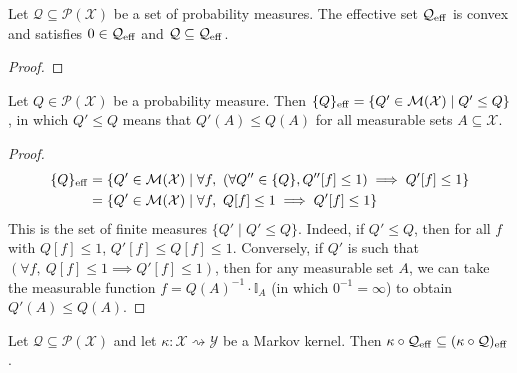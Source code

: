 \begin{lemma}\label{lem:convex_effectiveSet}
  Let $\mathcal{Q} \subseteq \mathcal{P}(\mathcal{X})$ be a set of probability measures.
The effective set $\mathcal{Q}_{\operatorname{eff}}$ is convex and satisfies $0 \in \mathcal{Q}_{\operatorname{eff}}$ and $\mathcal{Q} \subseteq \mathcal{Q}_{\operatorname{eff}}$.
\end{lemma}

\begin{proof}

\end{proof}


\begin{lemma}\label{lem:effectiveSet_singleton}
Let $Q \in \mathcal{P}(\mathcal{X})$ be a probability measure. Then $\{Q\}_{\operatorname{eff}} = \{Q' \in \mathcal{M}(\mathcal{X}) \mid Q' \le Q\}$, in which $Q' \le Q$ means that $Q'(A) \le Q(A)$ for all measurable sets $A \subseteq \mathcal{X}$.
\end{lemma}

\begin{proof}
\begin{align*}
  \{Q\}_{\operatorname{eff}}
  &= \{Q' \in \mathcal{M}(\mathcal{X}) \mid \forall f, \ (\forall Q'' \in \{Q\}, Q''[f] \le 1) \implies Q'[f] \le 1\}
  \\
  &= \{Q' \in \mathcal{M}(\mathcal{X}) \mid \forall f, \ Q[f] \le 1 \implies Q'[f] \le 1\}
\end{align*}
This is the set of finite measures $\{Q' \mid Q' \le Q\}$.
Indeed, if $Q' \le Q$, then for all $f$ with $Q[f] \le 1$, $Q'[f] \le Q[f] \le 1$.
Conversely, if $Q'$ is such that $(\forall f, \ Q[f] \le 1 \implies Q'[f] \le 1)$, then for any measurable set $A$, we can take the measurable function $f = Q(A)^{-1} \cdot \mathbb{I}_A$ (in which $0^{-1} = \infty$) to obtain $Q'(A) \le Q(A)$.
\end{proof}


\begin{lemma}\label{lem:effectiveSet_comp_subset}
Let $\mathcal{Q} \subseteq \mathcal{P}(\mathcal{X})$ and let $\kappa : \mathcal{X} \rightsquigarrow \mathcal{Y}$ be a Markov kernel.
Then $\kappa \circ \mathcal{Q}_{\operatorname{eff}} \subseteq (\kappa \circ \mathcal{Q})_{\operatorname{eff}}$.
\end{lemma}

